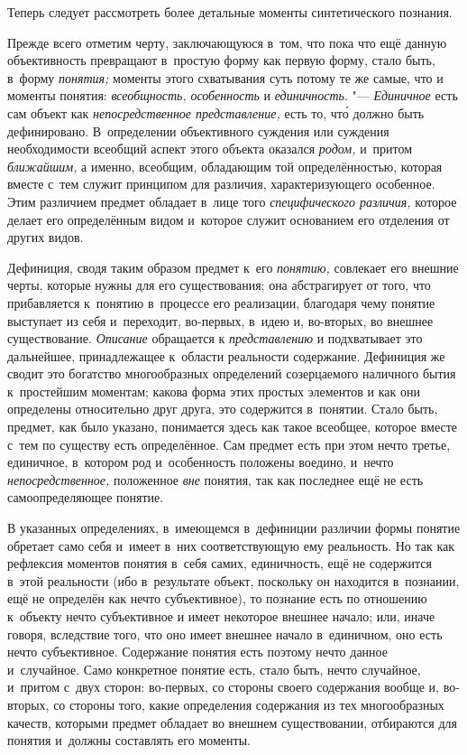 Теперь следует рассмотреть более детальные моменты синтетического познания.


Прежде всего отметим черту, заключающуюся в~том, что пока что
ещё данную объективность превращают в~простую форму как первую форму, стало
быть, в~форму {\em понятия;}
моменты этого схватывания суть потому те же самые, что и
моменты понятия: {\em всеобщность,}
{\em особенность} и
{\em единичность}. "---
{\em Единичное} есть сам
объект как {\em непосредственное
представление,} есть то, чт\'{о} должно быть дефинировано.
В~определении объективного суждения или суждения необходимости всеобщий
аспект этого объекта оказался
{\em родом,} и~притом
{\em ближайшим,} а
именно, всеобщим, обладающим той определённостью, которая вместе с~тем
служит принципом для различия, характеризующего особенное. Этим различием
предмет обладает в~лице того
{\em специфического различия,}
которое делает его определённым видом и~которое служит
основанием его отделения от других видов.

Дефиниция, сводя таким образом предмет к~его
{\em понятию,} совлекает
его внешние черты, которые нужны для его существования; она абстрагирует от
того, что прибавляется к~понятию в~процессе его реализации, благодаря чему
понятие выступает из себя и~переходит, во-первых, в~идею и, во-вторых, во
внешнее существование. {\em Описание}
обращается к
{\em представлению} и
подхватывает это дальнейшее, принадлежащее к~области реальности содержание.
Дефиниция же сводит это богатство многообразных определений созерцаемого
наличного бытия к~простейшим моментам; какова форма этих простых элементов
и как они определены относительно друг друга, это содержится в~понятии.
Стало быть, предмет, как было указано, понимается здесь как такое всеобщее,
которое вместе с~тем по существу есть определённое. Сам предмет есть при
этом нечто третье, единичное, в~котором род и~особенность
положены воедино, и~нечто
{\em непосредственное,}
положенное {\em вне}
понятия, так как последнее ещё не есть самоопределяющее
понятие.

В указанных определениях, в~имеющемся в~дефиниции различии
формы понятие обретает само себя и~имеет в~них соответствующую ему
реальность. Но так как рефлексия моментов понятия в~себя самих,
единичность, ещё не содержится в~этой реальности (ибо в~результате объект,
поскольку он находится в~познании, ещё не определён как нечто
субъективное), то познание есть по отношению к~объекту нечто субъективное и
имеет некоторое внешнее начало; или, иначе говоря, вследствие того, что оно
имеет внешнее начало в~единичном, оно есть нечто субъективное. Содержание
понятия есть поэтому нечто данное и~случайное. Само конкретное понятие
есть, стало быть, нечто случайное, и~притом с~двух сторон: во-первых, со
стороны своего содержания вообще и, во-вторых, со стороны того, какие
определения содержания из тех многообразных качеств, которыми предмет
обладает во внешнем существовании, отбираются для понятия и~должны
составлять его моменты.

